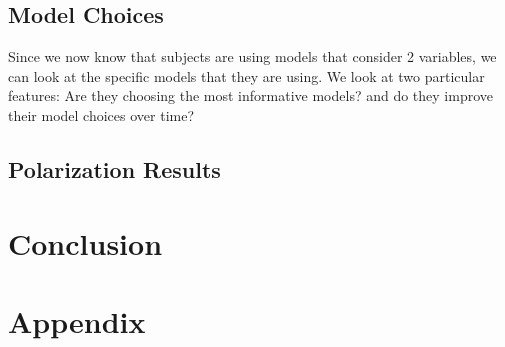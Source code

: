 \documentclass[
  12pt,
]{article}
\begin{document}
\hypertarget{model-choices}{%
\subsection{Model Choices}\label{model-choices}}

Since we now know that subjects are using models that consider 2
variables, we can look at the specific models that they are using. We
look at two particular features: Are they choosing the most informative
models? and do they improve their model choices over time?

\hypertarget{polarization-results}{%
\subsection{Polarization Results}\label{polarization-results}}

\hypertarget{conclusion}{%
\section{Conclusion}\label{conclusion}}

\newpage
\appendix

\hypertarget{appendix}{%
\section{Appendix}\label{appendix}}

 
  \providecommand{\huxb}[2]{\arrayrulecolor[RGB]{#1}\global\arrayrulewidth=#2pt}
  \providecommand{\huxvb}[2]{\color[RGB]{#1}\vrule width #2pt}
  \providecommand{\huxtpad}[1]{\rule{0pt}{#1}}
  \providecommand{\huxbpad}[1]{\rule[-#1]{0pt}{#1}}
\end{document}
